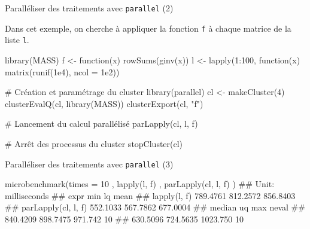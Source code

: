 \documentclass[12pt,ignorenonframetext,handout,]{beamer}
\newenvironment{Shaded}{}{}
\newcommand{\CommentTok}[1]{\textcolor[rgb]{0.00,0.50,0.00}{#1}}
\newcommand{\ControlFlowTok}[1]{\textcolor[rgb]{0.00,0.00,1.00}{#1}}
\newcommand{\DataTypeTok}[1]{#1}
\newcommand{\DecValTok}[1]{#1}
\newcommand{\FloatTok}[1]{#1}
\newcommand{\KeywordTok}[1]{\textcolor[rgb]{0.00,0.00,1.00}{#1}}
\newcommand{\NormalTok}[1]{#1}
\newcommand{\OperatorTok}[1]{#1}
\newcommand{\StringTok}[1]{\textcolor[rgb]{0.00,0.50,0.50}{#1}}
\renewenvironment{Shaded}{\begin{snugshade}}{\end{snugshade}}
\begin{document}
\begin{frame}[fragile]{\large Paralléliser des traitements avec
\texttt{parallel} (2)}
\protect\hypertarget{paralleliser-des-traitements-avec-parallel-2}{}

Dans cet exemple, on cherche à appliquer la fonction \texttt{f} à chaque
matrice de la liste \texttt{l}.

\pause \footnotesize

\begin{Shaded}
\begin{Highlighting}[]
\KeywordTok{library}\NormalTok{(MASS)}
\NormalTok{f <-}\StringTok{ }\ControlFlowTok{function}\NormalTok{(x) }\KeywordTok{rowSums}\NormalTok{(}\KeywordTok{ginv}\NormalTok{(x))}
\NormalTok{l <-}\StringTok{ }\KeywordTok{lapply}\NormalTok{(}\DecValTok{1}\OperatorTok{:}\DecValTok{100}\NormalTok{, }\ControlFlowTok{function}\NormalTok{(x) }\KeywordTok{matrix}\NormalTok{(}\KeywordTok{runif}\NormalTok{(}\FloatTok{1e4}\NormalTok{), }\DataTypeTok{ncol =} \FloatTok{1e2}\NormalTok{))}

\CommentTok{# Création et paramétrage du cluster}
\KeywordTok{library}\NormalTok{(parallel)}
\NormalTok{cl <-}\StringTok{ }\KeywordTok{makeCluster}\NormalTok{(}\DecValTok{4}\NormalTok{)}
\KeywordTok{clusterEvalQ}\NormalTok{(cl, }\KeywordTok{library}\NormalTok{(MASS))}
\KeywordTok{clusterExport}\NormalTok{(cl, }\StringTok{"f"}\NormalTok{)}

\CommentTok{# Lancement du calcul parallélisé}
\KeywordTok{parLapply}\NormalTok{(cl, l, f)}

\CommentTok{# Arrêt des processus du cluster}
\KeywordTok{stopCluster}\NormalTok{(cl)}
\end{Highlighting}
\end{Shaded}

\end{frame}

\begin{frame}[fragile]{\large Paralléliser des traitements avec
\texttt{parallel} (3)}
\protect\hypertarget{paralleliser-des-traitements-avec-parallel-3}{}

\pause

\begin{Shaded}
\begin{Highlighting}[]
\KeywordTok{microbenchmark}\NormalTok{(}\DataTypeTok{times =} \DecValTok{10}
\NormalTok{  , }\KeywordTok{lapply}\NormalTok{(l, f)}
\NormalTok{  , }\KeywordTok{parLapply}\NormalTok{(cl, l, f)}
\NormalTok{)}
\NormalTok{  ## Unit: milliseconds}
\NormalTok{  ##                 expr      min       lq     mean}
\NormalTok{  ##         lapply(l, f) 789.4761 812.2572 856.8403}
\NormalTok{  ##  parLapply(cl, l, f) 552.1033 567.7862 677.0004}
\NormalTok{  ##    median       uq      max neval}
\NormalTok{  ##  840.4209 898.7475  971.742    10}
\NormalTok{  ##  630.5096 724.5635 1023.750    10}
\end{Highlighting}
\end{Shaded}

\pause

\end{frame}
\end{document}
